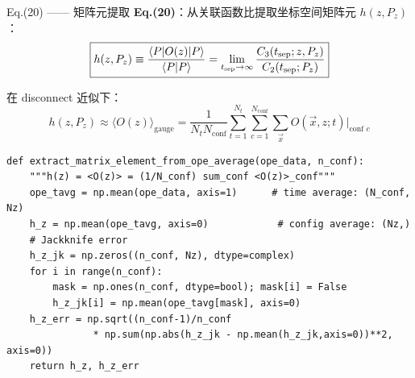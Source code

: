 \documentclass[10pt,aspectratio=169]{beamer}
\newcommand{\Pz}{P_z}
\begin{document}
\begin{frame}[fragile]{Eq.(20) —— 矩阵元提取}
\small
\textbf{Eq.(20)}：从关联函数比提取坐标空间矩阵元 $h(z, \Pz)$：
\begin{equation}
  \boxed{
  h(z, \Pz) \equiv \frac{\braket{P | O(z) | P}}{\braket{P|P}}
  = \lim_{t_{\text{sep}} \to \infty}
  \frac{C_3(t_{\text{sep}}; z, \Pz)}{C_2(t_{\text{sep}}; \Pz)}
  }
\end{equation}

在 disconnect 近似下：
\begin{equation}
  h(z, \Pz) \approx \langle O(z) \rangle_{\text{gauge}}
  = \frac{1}{N_t N_{\text{conf}}} \sum_{t=1}^{N_t} \sum_{c=1}^{N_{\text{conf}}}
  \sum_{\vec{x}} O(\vec{x}, z; t)\big|_{\text{conf }c}
\end{equation}

\begin{lstlisting}
def extract_matrix_element_from_ope_average(ope_data, n_conf):
    """h(z) = <O(z)> = (1/N_conf) sum_conf <O(z)>_conf"""
    ope_tavg = np.mean(ope_data, axis=1)      # time average: (N_conf, Nz)
    h_z = np.mean(ope_tavg, axis=0)            # config average: (Nz,)
    # Jackknife error
    h_z_jk = np.zeros((n_conf, Nz), dtype=complex)
    for i in range(n_conf):
        mask = np.ones(n_conf, dtype=bool); mask[i] = False
        h_z_jk[i] = np.mean(ope_tavg[mask], axis=0)
    h_z_err = np.sqrt((n_conf-1)/n_conf
               * np.sum(np.abs(h_z_jk - np.mean(h_z_jk,axis=0))**2, axis=0))
    return h_z, h_z_err
\end{lstlisting}
\end{frame}
\end{document}
